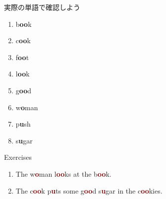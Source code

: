 \documentclass[aspectratio=169,xcolor={dvipsnames,table}]{beamer}
\begin{document}
\begin{frame}[plain]{実際の単語で確認しよう}
\LARGE

\begin{enumerate}
 \item b\textcolor{NavyBlue}{\bfseries oo}k%
\hfill{}\hspace{150pt}\mbox{}
 \item c\textcolor{NavyBlue}{\bfseries oo}k%
\hfill{}\hspace{150pt}\mbox{}
\item f\textcolor{NavyBlue}{\bfseries oo}t%
\hfill{}\hspace{150pt}\mbox{}
 \item l\textcolor{NavyBlue}{\bfseries oo}k%
\hfill{}\hspace{150pt}\mbox{}
 \item g\textcolor{NavyBlue}{\bfseries oo}d%
\hfill{}\hspace{150pt}\mbox{}
 \item w\textcolor{NavyBlue}{\bfseries o}man%
\hfill{}\hspace{150pt}\mbox{} 
 \item p\textcolor{NavyBlue}{\bfseries u}sh%
\hfill{}\hspace{150pt}\mbox{}
 \item s\textcolor{NavyBlue}{\bfseries u}gar%
\hfill{}\hspace{150pt}\mbox{}
\end{enumerate}
\end{frame}
\begin{frame}[plain]{Exercises}
\LARGE
\begin{enumerate}
 \item The w\textcolor{Maroon}{\bfseries o}man l\textcolor{Maroon}{\bfseries oo}ks at the b\textcolor{Maroon}{\bfseries oo}k.
 \item The c\textcolor{Maroon}{\bfseries oo}k p\textcolor{Maroon}{\bfseries u}ts some g\textcolor{Maroon}{\bfseries oo}d s\textcolor{Maroon}{\bfseries u}gar in the c\textcolor{Maroon}{\bfseries oo}kies.
\end{enumerate}
\end{frame}
\end{document}
